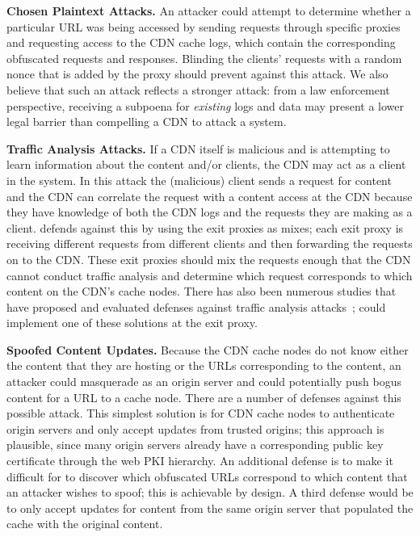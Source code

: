 \textbf{Chosen Plaintext Attacks.} An attacker could attempt to
determine whether a particular URL was being accessed by sending requests
through specific \system{} proxies and requesting access to the CDN cache logs, 
which contain the corresponding obfuscated
requests and responses. Blinding the clients' requests
with a random nonce that is added by the proxy should prevent against this
attack. We also believe that such an attack reflects a stronger attack: from a
law enforcement perspective, receiving a subpoena for {\em existing} logs and
data may present a lower legal barrier than compelling a CDN to attack a
system.

\textbf{Traffic Analysis Attacks.} If a CDN itself is malicious and is attempting 
to learn information about the content and/or clients, the CDN may act as a client 
in the system.  In this attack the (malicious) client sends a request for content 
and the CDN can correlate the request with a content access at the CDN because they have 
knowledge of both the CDN logs and the requests they are making as a client.  \system{} 
defends against this by using the exit proxies as mixes; each exit proxy is receiving 
different requests from different clients and then forwarding the requests on to the CDN.  
These exit proxies should mix the requests enough that the CDN cannot conduct traffic analysis
 and determine which request corresponds to which content on the CDN's cache nodes.  There has 
also been numerous studies that have proposed and evaluated defenses against traffic 
analysis attacks~\cite{wright2009traffic,rackoff1993cryptographic}; \system{} could implement one of these solutions at the exit 
proxy.

\textbf{Spoofed Content Updates.} Because the CDN cache
nodes do not know either the content that they are hosting or the URLs
corresponding to the content, an attacker could masquerade as an origin server
and could potentially push bogus content for a URL to a cache node. There are
a number of defenses against this possible attack. This simplest solution is
for CDN cache nodes to authenticate origin servers and only accept updates
from trusted origins; this approach is plausible, since many origin servers already
have a corresponding public key certificate through the web PKI hierarchy.  An additional
defense is to make it difficult for to discover which obfuscated URLs correspond
to which content that an attacker wishes to spoof; this is achievable by design.
A third defense would be to only accept updates for content from the same origin
server that populated the cache with the original content.

